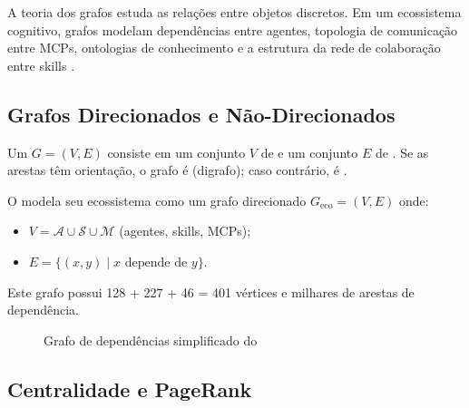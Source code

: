 A teoria dos grafos estuda as relações entre objetos discretos. Em um
ecossistema cognitivo, grafos modelam dependências entre agentes, topologia
de comunicação entre MCPs, ontologias de conhecimento e a estrutura da rede
de colaboração entre skills \cite{barabasi2016network,
wooldridge2009multiagent}.

\subsection{Grafos Direcionados e Não-Direcionados}

\begin{definicao}[Grafo]
    Um  $G = (V, E)$ consiste em um conjunto $V$ de
     e um conjunto $E$ de . Se as
    arestas têm orientação, o grafo é  (digrafo); caso
    contrário, é .
\end{definicao}

\begin{exemplo}
    O \opencodeeco{} modela seu ecossistema como um grafo direcionado
    $G_{\text{eco}} = (V, E)$ onde:
    \begin{itemize}
        \item $V = \mathcal{A} \cup \mathcal{S} \cup \mathcal{M}$ (agentes,
              skills, MCPs);
        \item $E = \{(x, y) \mid x \text{ depende de } y\}$.
    \end{itemize}
    Este grafo possui 128 + 227 + 46 = 401 vértices e milhares de arestas
    de dependência.
\end{exemplo}

\begin{figure}[htb]
    \centering
    \caption{Grafo de dependências simplificado do \opencodeeco{}}
    \label{fig:grafo-dependencias}
\end{figure}

\subsection{Centralidade e PageRank}

